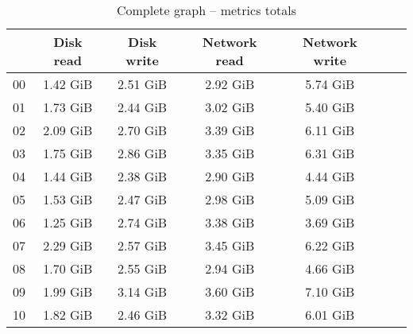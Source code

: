 \begin{table}[H]
\begin{center}
\caption{Complete graph -- metrics totals}
\label{tab:graph-complete-total}
\begin{tabular}{|c|c|c|c|c|c|c|}
\hline
   & Disk read & Disk write & Network read & Network write\\
\hline
00 & 1.42 GiB & 2.51 GiB & 2.92 GiB & 5.74 GiB\\
01 & 1.73 GiB & 2.44 GiB & 3.02 GiB & 5.40 GiB\\
02 & 2.09 GiB & 2.70 GiB & 3.39 GiB & 6.11 GiB\\
03 & 1.75 GiB & 2.86 GiB & 3.35 GiB & 6.31 GiB\\
04 & 1.44 GiB & 2.38 GiB & 2.90 GiB & 4.44 GiB\\
05 & 1.53 GiB & 2.47 GiB & 2.98 GiB & 5.09 GiB\\
06 & 1.25 GiB & 2.74 GiB & 3.38 GiB & 3.69 GiB\\
07 & 2.29 GiB & 2.57 GiB & 3.45 GiB & 6.22 GiB\\
08 & 1.70 GiB & 2.55 GiB & 2.94 GiB & 4.66 GiB\\
09 & 1.99 GiB & 3.14 GiB & 3.60 GiB & 7.10 GiB\\
10 & 1.82 GiB & 2.46 GiB & 3.32 GiB & 6.01 GiB\\
\hline
\end{tabular}
\end{center}
\end{table}
